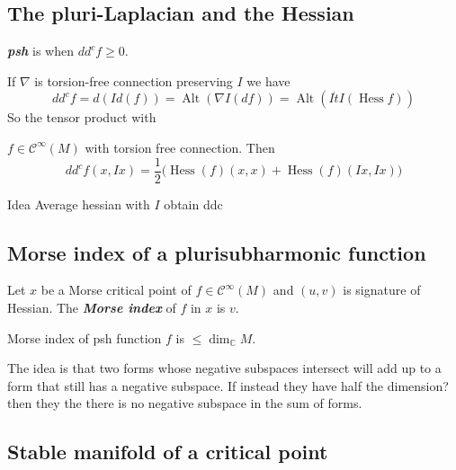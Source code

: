 \subsection{The pluri-Laplacian and the Hessian}

\begin{defn}\leavevmode
	\textit{\textbf{psh}} is when $d d^cf\geq 0$.
\end{defn}

\begin{remark}\leavevmode
	If $\nabla$ is torsion-free connection preserving $I$  we have
	\[d d^cf=d(I d(f))=\operatorname{Alt}(\nabla I(df))=\operatorname{Alt}(I \dot t I(\operatorname{Hes s}f))\]
	So the tensor product with 
\end{remark}

\begin{coro}\leavevmode
	$f \in \mathcal{C}^\infty(M)$ with torsion free connection. Then
	\[d d^cf(x,Ix)=\frac{1}{2} \big(\operatorname{Hess}(f)(x,x)+\operatorname{Hess}(f)(Ix,Ix)\big)\]
\end{coro}

\begin{thing4}{Idea}\leavevmode
	Average hessian with $I$ obtain ddc
\end{thing4}

\subsection{Morse index of a plurisubharmonic function}

\begin{defn}\leavevmode
	Let $x$ be a Morse critical point of $f\in \mathcal{C}^\infty(M)$ and $(u,v)$ is signature of Hessian. The  \textit{\textbf{Morse index}} of $f$ in $x$ is $v$.
\end{defn}

\begin{thm}\leavevmode
	Morse index of psh function $f$ is $\leq \dim_{\mathbb{C}}M$.
\end{thm}

\begin{thing5}{The idea}\leavevmode
	is that two forms whose negative subspaces intersect will add up to a form that still has a negative subspace. If instead they have {\color{3}half the dimension?} then they the there is no negative subspace in the sum of forms.
\end{thing5}

\subsection{Stable manifold of a critical point}

